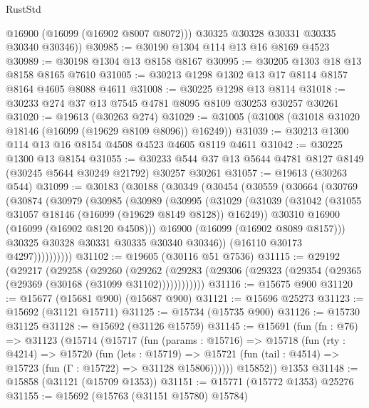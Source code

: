 \begin{lexlean}{RustStd}
\begin{coremodule}
          @16900
          (@16099 (@16902 @8007 @8072)))
        @30325
        @30328
        @30331
        @30335
        @30340
        @30346))
@30985 := @30190 @1304 @114 @13 @16 @8169 @4523
@30989 := @30198 @1304 @13 @8158 @8167
@30995 := @30205 @1303 @18 @13 @8158 @8165 @7610
@31005 := @30213 @1298 @1302 @13 @17 @8114 @8157 @8164 @4605 @8088 @4611
@31008 := @30225 @1298 @13 @8114
@31018 := @30233 @274 @37 @13 @7545 @4781 @8095 @8109 @30253 @30257 @30261
@31020 := @19613 (@30263 @274)
@31029 := @31005 (@31008 (@31018 @31020 @18146 (@16099 (@19629 @8109 @8096)) @16249))
@31039 := @30213 @1300 @114 @13 @16 @8154 @4508 @4523 @4605 @8119 @4611
@31042 := @30225 @1300 @13 @8154
@31055 := @30233 @544 @37 @13 @5644 @4781 @8127 @8149 (@30245 @5644 @30249 @21792) @30257 @30261
@31057 := @19613 (@30263 @544)
@31099 := @30183
    (@30188
      (@30349
        (@30454
          (@30559
            (@30664
              (@30769
                (@30874
                  (@30979
                    (@30985
                      (@30989
                        (@30995
                          (@31029
                            (@31039
                              (@31042 (@31055 @31057 @18146 (@16099 (@19629 @8149 @8128)) @16249))
                              @30310
                              @16900
                              (@16099 (@16902 @8120 @4508)))
                            @16900
                            (@16099 (@16902 @8089 @8157)))
                          @30325
                          @30328
                          @30331
                          @30335
                          @30340
                          @30346))
                      (@16110 @30173 @4297))))))))))
@31102 := @19605 (@30116 @51 @7536)
@31115 := @29192
    (@29217
      (@29258
        (@29260
          (@29262 (@29283 (@29306 (@29323 (@29354 (@29365 (@29369 (@30168 (@31099 @31102))))))))))))
@31116 := @15675 @900
@31120 := @15677 (@15681 @900) (@15687 @900)
@31121 := @15696 @25273
@31123 := @15692 (@31121 @15711)
@31125 := @15734 (@15735 @900)
@31126 := @15730 @31125
@31128 := @15692 (@31126 @15759)
@31145 := @15691
    (fun (fn : @76) =>
    @31123
      (@15714
        (@15717
          (fun (params : @15716) =>
          @15718
            (fun (rty : @4214) =>
            @15720
              (fun (lets : @15719) =>
              @15721 (fun (tail : @4514) => @15723 (fun (Γ : @15722) => @31128 @15806))))))
        @15852))
    @1353
@31148 := @15858 (@31121 (@15709 @1353))
@31151 := @15771 (@15772 @1353) @25276
@31155 := @15692 (@15763 (@31151 @15780) @15784)

\end{coremodule}
\end{lexlean}
